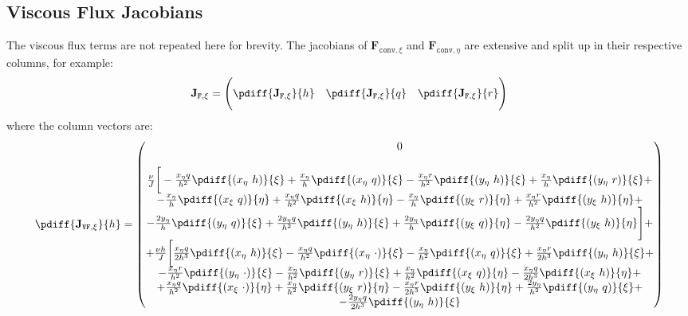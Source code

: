 {{\subsection{Viscous Flux Jacobians}
The viscous flux terms are not repeated here for brevity.
The jacobians of $\mathbf{F}_{\texttt{conv},\xi}$ and $\mathbf{F}_{\texttt{conv},\eta}$ are extensive and split up in their respective columns, for example:
%
\begin{align}
	\mathbf{J}_{\texttt{F},\xi} = \Bigg(
	\pdiff{\mathbf{J}_{\texttt{F},\xi}}{h} \quad
	\pdiff{\mathbf{J}_{\texttt{F},\xi}}{q} \quad
	\pdiff{\mathbf{J}_{\texttt{F},\xi}}{r}\Bigg)
\end{align}
%
where the column vectors are:
%
\begin{align}
	\pdiff{\mathbf{J}_{\texttt{VF},\xi}}{h}=
		\begin{pmatrix}
	0 \\
	\\
	\frac{\nu}{J} \bigg[
		-\frac{x_{\eta} q}{h^2}\pdiff{(x_{\eta}\ h)}{\xi}
		+ \frac{x_{\eta}}{h} \pdiff{(x_{\eta}\ q)}{\xi}
		- \frac{x_{\eta}r}{h^2} \pdiff{(y_{\eta}\ h)}{\xi}
		+ \frac{x_{\eta}}{h} \pdiff{(y_{\eta}\ r)}{\xi} + \\
		- \frac{x_{\eta} }{h} \pdiff{(x_{\xi}\ q)}{\eta}
		+ \frac{x_{\eta} q}{h^2} \pdiff{ (x_{\xi}\ h)}{\eta}
		- \frac{x_{\eta} }{h} \pdiff{(y_{\xi}\ r)}{\eta}
		+ \frac{x_{\eta} r}{h^2} \pdiff{ (y_{\xi}\ h)}{\eta} + \\
		- \frac{2 y_{\eta}}{h}  \pdiff{ (y_{\eta}\ q)}{\xi}
		+ \frac{2 y_{\eta} q }{h^2}  \pdiff{ (y_{\eta}\ h)}{\xi}
		+ \frac{2 y_{\eta}}{h}  \pdiff{(y_{\xi}\ q)}{\eta}
		- \frac{2 y_{\eta} q}{h^2} \pdiff{(y_{\xi}\ h)}{\eta}\Bigg]  + \\
	+\frac{\nu h}{J} \bigg[
		\frac{x_{\eta} q}{2h^3}\pdiff{(x_{\eta}\ h)}{\xi}
		-\frac{x_{\eta} q}{h^2}\pdiff{(x_{\eta}\ \cdot)}{\xi}
		- \frac{x_{\eta}}{h^2} \pdiff{(x_{\eta}\ q)}{\xi}
		+ \frac{x_{\eta}r}{2h^3} \pdiff{(y_{\eta}\ h)}{\xi} + \\
		- \frac{x_{\eta}r}{h^2} \pdiff{(y_{\eta}\ \cdot)}{\xi}
		- \frac{x_{\eta}}{h^2} \pdiff{(y_{\eta}\ r)}{\xi}
		+ \frac{x_{\eta} }{h^2} \pdiff{(x_{\xi}\ q)}{\eta}
		- \frac{x_{\eta} q}{2h^3} \pdiff{ (x_{\xi}\ h)}{\eta} + \\
		+ \frac{x_{\eta} q}{h^2} \pdiff{ (x_{\xi}\ \cdot)}{\eta}
		+ \frac{x_{\eta} }{h^2} \pdiff{(y_{\xi}\ r)}{\eta}
		- \frac{x_{\eta} r}{2h^3} \pdiff{ (y_{\xi}\ h)}{\eta}
		+ \frac{2 y_{\eta}}{h^2}  \pdiff{ (y_{\eta}\ q)}{\xi} + \\
		- \frac{2 y_{\eta} q }{2h^3}  \pdiff{ (y_{\eta}\ h)}{\xi}

\end{pmatrix}
\end{align}}}
